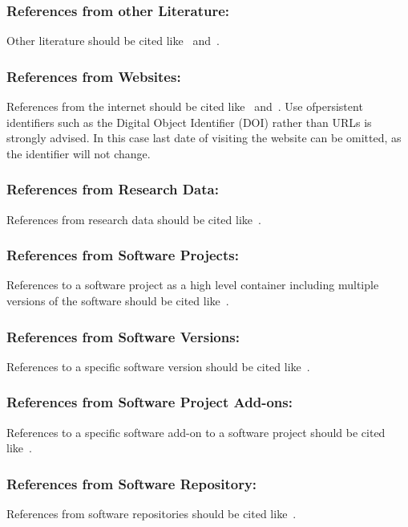 \documentclass{isprs} %
\begin{document}
\subsubsection{References from other Literature:}
Other literature should be cited like~\cite{smith1987rep} and~\cite{smith2000}.

\subsubsection{References from Websites:}
References from the internet should be cited like~\cite{chan2017} and~\cite{maas2017}. Use ofpersistent identifiers such as the Digital Object Identifier (DOI) rather than URLs is strongly advised. In this case last date of visiting the website can be omitted, as the identifier will not change.

\subsubsection{References from Research Data:}
References from research data should be cited like~\cite{dubayah2013}.

\subsubsection{References from Software Projects:}
References to a software project as a high level container including multiple versions of the software should be cited like~\cite{grass2017}.

\subsubsection{References from Software Versions:}
References to a specific software version should be cited like~\cite{grass2015}.

\subsubsection{References from Software Project Add-ons:}
References to a specific software add-on to a software project should be cited like~\cite{lennert2017}.

\subsubsection{References from Software Repository:}
References from software repositories should be cited like~\cite{gago2016}.
\end{document}
